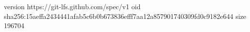 version https://git-lfs.github.com/spec/v1
oid sha256:15aeffa2434441afab5c6b0b673836efff7aa12a857901740309fd0c9182e644
size 196704
